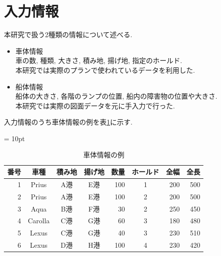 \section{入力情報}
本研究で扱う2種類の情報について述べる.

\begin{itemize}
    \item 車体情報 \\
    車の数, 種類, 大きさ, 積み地, 揚げ地, 指定のホールド. \\
    本研究では実際のプランで使われているデータを利用した.
    \item 船体情報 \\
    船体の大きさ, 各階のランプの位置, 船内の障害物の位置や大きさ. \\
    本研究では実際の図面データを元に手入力で行った.

\end{itemize}
入力情報のうち車体情報の例を表\ref{table21}に示す.

\begin{table}[htbp]
    \tabcolsep = 10pt
    \renewcommand{\arraystretch}{0.7}
    \caption{車体情報の例}
    \label{table21}
    \begin{center}
    \begin{tabular}{rcccrcrr} \hline
    番号 & 車種 & 積み地 & 揚げ地 & 数量 & ホールド & 全幅 & 全長 \\ \hline
    1 & Prius & A港 & E港 & 100 & 1 & 200 & 500 \\
    2 & Prius & A港 & E港 & 100 & 2 & 200 & 500 \\
    3 & Aqua & B港 & F港 & 30 & 2 & 250 & 450 \\
    4 & Carolla & C港 & G港 & 60 & 3 & 180 & 480 \\
    5 & Lexus & C港 & G港 & 40 & 3 & 230 & 510 \\
    6 & Lexus & D港 & H港 & 100 & 4 & 230 & 420 \\
    \hline
    \end{tabular}
    \end{center}
    \end{table}




